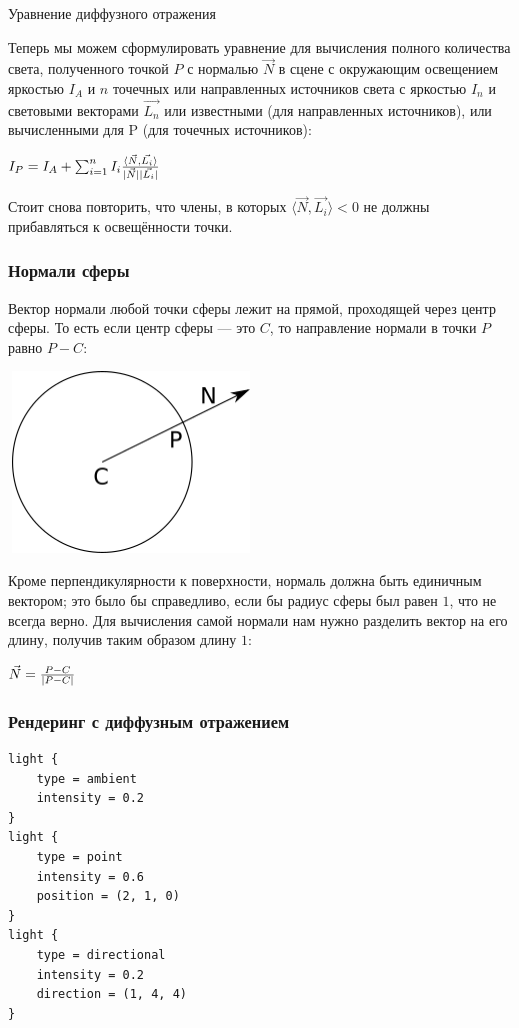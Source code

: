 Уравнение диффузного отражения

Теперь мы можем сформулировать уравнение для вычисления полного количества света, полученного точкой $P$ с нормалью $\vec{N}$ в сцене с окружающим освещением яркостью $I_A$ и $n$ точечных или направленных источников света с яркостью $I_n$ и световыми векторами $\vec{L_n}$ или известными (для направленных источников), или вычисленными для P (для точечных источников):

$I_P = I_A + \sum_{i = 1}^{n} I_i {{\langle \vec{N}, \vec{L_i} \rangle} \over {|\vec{N}||\vec{L_i}|}}$

Стоит снова повторить, что члены, в которых $\langle \vec{N}, \vec{L_i} \rangle < 0$ не должны прибавляться к освещённости точки.

\subsubsection{Нормали сферы}

Вектор нормали любой точки сферы лежит на прямой, проходящей через центр сферы. То есть если центр сферы — это $C$, то направление нормали в точки $P$ равно $P - C$:

\includegraphics[width=6.5cm, height=4.8cm]{sphere.png}

Кроме перпендикулярности к поверхности, нормаль должна быть единичным вектором; это было бы справедливо, если бы радиус сферы был равен $1$, что не всегда верно. Для вычисления самой нормали нам нужно разделить вектор на его длину, получив таким образом длину $1$:

$\vec{N} = {{P - C} \over {|P - C|}}$

\subsubsection{Рендеринг с диффузным отражением}
\begin{lstlisting}
light {
    type = ambient
    intensity = 0.2
}
light {
    type = point
    intensity = 0.6
    position = (2, 1, 0)
}
light {
    type = directional
    intensity = 0.2
    direction = (1, 4, 4)
}
\end{lstlisting}

